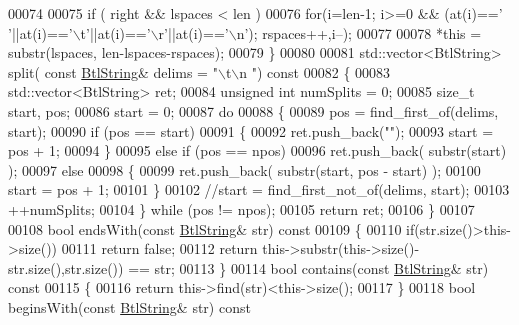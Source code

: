 \begin{DoxyCode}
00074 
00075         \textcolor{keywordflow}{if} ( right && lspaces < len )
00076             \textcolor{keywordflow}{for}(i=len-1; i>=0 && (at(i)==\textcolor{charliteral}{' '}||at(i)==\textcolor{charliteral}{'\(\backslash\)t'}||at(i)==\textcolor{charliteral}{'\(\backslash\)r'}||at(i)==\textcolor{charliteral}{'\(\backslash\)n'}); rspaces++,i--);
00077 
00078         *\textcolor{keyword}{this} = substr(lspaces, len-lspaces-rspaces);
00079     \}
00080 
00081     std::vector<BtlString> split( \textcolor{keyword}{const} \hyperlink{class_btl_string}{BtlString}& delims = \textcolor{stringliteral}{"\(\backslash\)t\(\backslash\)n "})\textcolor{keyword}{ const}
00082 \textcolor{keyword}{    }\{
00083         std::vector<BtlString> ret;
00084         \textcolor{keywordtype}{unsigned} \textcolor{keywordtype}{int} numSplits = 0;
00085         \textcolor{keywordtype}{size\_t} start, pos;
00086         start = 0;
00087         \textcolor{keywordflow}{do}
00088         \{
00089             pos = find\_first\_of(delims, start);
00090             \textcolor{keywordflow}{if} (pos == start)
00091             \{
00092                 ret.push\_back(\textcolor{stringliteral}{""});
00093                 start = pos + 1;
00094             \}
00095             \textcolor{keywordflow}{else} \textcolor{keywordflow}{if} (pos == npos)
00096                 ret.push\_back( substr(start) );
00097             \textcolor{keywordflow}{else}
00098             \{
00099                 ret.push\_back( substr(start, pos - start) );
00100                 start = pos + 1;
00101             \}
00102             \textcolor{comment}{//start = find\_first\_not\_of(delims, start);}
00103             ++numSplits;
00104         \} \textcolor{keywordflow}{while} (pos != npos);
00105         \textcolor{keywordflow}{return} ret;
00106     \}
00107 
00108     \textcolor{keywordtype}{bool} endsWith(\textcolor{keyword}{const} \hyperlink{class_btl_string}{BtlString}& str)\textcolor{keyword}{ const}
00109 \textcolor{keyword}{    }\{
00110         \textcolor{keywordflow}{if}(str.size()>this->size())
00111             \textcolor{keywordflow}{return} \textcolor{keyword}{false};
00112         \textcolor{keywordflow}{return} this->substr(this->size()-str.size(),str.size()) == str;
00113     \}
00114     \textcolor{keywordtype}{bool} contains(\textcolor{keyword}{const} \hyperlink{class_btl_string}{BtlString}& str)\textcolor{keyword}{ const}
00115 \textcolor{keyword}{    }\{
00116         \textcolor{keywordflow}{return} this->find(str)<this->size();
00117     \}
00118     \textcolor{keywordtype}{bool} beginsWith(\textcolor{keyword}{const} \hyperlink{class_btl_string}{BtlString}& str)\textcolor{keyword}{ const}

\end{DoxyCode}
